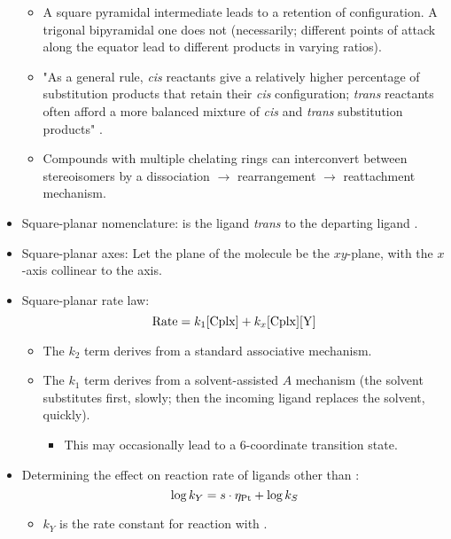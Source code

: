 \documentclass[../notes.tex]{subfiles}
\begin{document}
\begin{itemize}
\begin{itemize}
        \item A square pyramidal intermediate leads to a retention of configuration. A trigonal bipyramidal one does not (necessarily; different points of attack along the equator lead to different products in varying ratios).
        \item "As a general rule, \emph{cis} reactants give a relatively higher percentage of substitution products that retain their \emph{cis} configuration; \emph{trans} reactants often afford a more balanced mixture of \emph{cis} and \emph{trans} substitution products" \parencite[456]{bib:MiesslerFischerTarr}.
        \item Compounds with multiple chelating rings can interconvert between stereoisomers by a dissociation $\to$ rearrangement $\to$ reattachment mechanism.
    \end{itemize}
    \item Square-planar nomenclature:  is the ligand \emph{trans} to the departing ligand .
    \item Square-planar axes: Let the plane of the molecule be the $xy$-plane, with the $x$-axis collinear to the  axis.
    \item Square-planar rate law:
    \begin{equation*}
        \text{Rate} = k_1\ce{[Cplx]}+k_x\ce{[Cplx][Y]}
    \end{equation*}
    \begin{itemize}
        \item The $k_2$ term derives from a standard associative mechanism.
        \item The $k_1$ term derives from a solvent-assisted $A$ mechanism (the solvent substitutes first, slowly; then the incoming ligand replaces the solvent, quickly).
        \begin{itemize}
            \item This may occasionally lead to a 6-coordinate transition state.
        \end{itemize}
    \end{itemize}
    \item Determining the effect on reaction rate of ligands other than :
    \begin{equation*}
        \log k_Y = s\cdot\eta_{\ce{Pt}}+\log k_S
    \end{equation*}
    \begin{itemize}
        \item $k_Y$ is the rate constant for reaction with .

\end{itemize}
\end{itemize}
\end{document}
